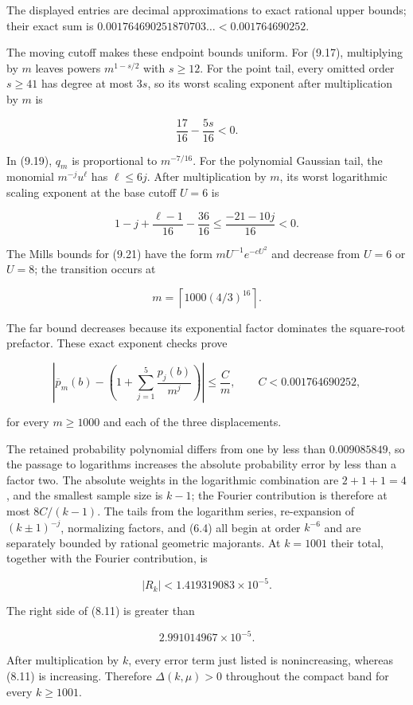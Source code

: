\documentclass[11pt]{article}
\numberwithin{equation}{section}
\begin{document}
The displayed entries are decimal approximations to exact rational upper bounds; their
exact sum is $0.001764690251870703\ldots<0.001764690252$.

The moving cutoff makes these endpoint bounds uniform. For (9.17), multiplying by $m$
leaves powers $m^{1-s/2}$ with $s\ge12$. For the point tail, every omitted order
$s\ge41$ has degree at most $3s$, so its worst scaling exponent after multiplication by
$m$ is

\[
\frac{17}{16}-\frac{5s}{16}<0.
\]

In (9.19), $q_m$ is proportional to $m^{-7/16}$. For the polynomial Gaussian tail,
the monomial $m^{-j}u^\ell$ has $\ell\le6j$. After multiplication by $m$, its worst
logarithmic scaling exponent at the base cutoff $U=6$ is

\[
1-j+\frac{\ell-1}{16}-\frac{36}{16}
\le\frac{-21-10j}{16}<0.
\]

The Mills bounds for (9.21) have the form $mU^{-1}e^{-cU^2}$ and decrease from
$U=6$ or $U=8$; the transition occurs at

\[
m=\left\lceil1000(4/3)^{16}\right\rceil.
\]

The far bound decreases because its exponential factor dominates the square-root
prefactor. These exact exponent checks prove

\[
\left|
\overline p_m(b)-\left(1+\sum_{j=1}^{5}\frac{p_j(b)}{m^j}\right)
\right|
\le\frac{C}{m},
\qquad
C<0.001764690252,
\tag{9.23}
\]

for every $m\ge1000$ and each of the three displacements.

The retained probability polynomial differs from one by less than $0.009085849$, so the
passage to logarithms increases the absolute probability error by less than a factor two.
The absolute weights in the logarithmic combination are $2+1+1=4$, and the smallest
sample size is $k-1$; the Fourier contribution is therefore at most $8C/(k-1)$. The
tails from the logarithm series, re-expansion of $(k\pm1)^{-j}$, normalizing factors, and
(6.4) all begin at order $k^{-6}$ and are separately bounded by rational geometric
majorants. At $k=1001$ their total, together with the Fourier contribution, is

\[
|R_k|<1.419319083\times10^{-5}.
\tag{9.24}
\]

The right side of (8.11) is greater than

\[
2.991014967\times10^{-5}.
\tag{9.25}
\]

After multiplication by $k$, every error term just listed is nonincreasing, whereas
(8.11) is increasing. Therefore $\Delta(k,\mu)>0$ throughout the compact band for every
$k\ge1001$.
\end{document}
